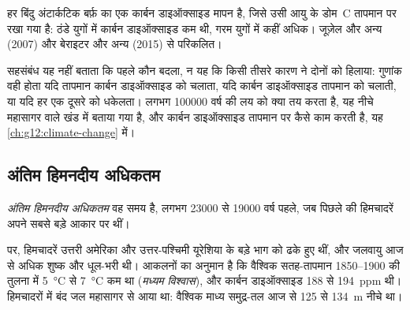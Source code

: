 \begin{omfigure}

{\small हर बिंदु अंटार्कटिक बर्फ़ का एक कार्बन डाइऑक्साइड मापन है,
जिसे उसी आयु के डोम~C तापमान पर रखा गया है: ठंडे युगों में कार्बन
डाइऑक्साइड कम थी, गरम युगों में कहीं अधिक। जूज़ेल और अन्य (2007) और
बेराइटर और अन्य (2015) से परिकलित।}
\end{omfigure}

सहसंबंध यह नहीं बताता कि पहले कौन बदला, न यह कि किसी तीसरे कारण ने
दोनों को हिलाया: गुणांक वही होता यदि तापमान कार्बन डाइऑक्साइड को चलाता,
यदि कार्बन डाइऑक्साइड तापमान को चलाती, या यदि हर एक दूसरे को धकेलता।
लगभग \num{100000} वर्ष की लय को क्या तय करता है, यह नीचे महासागर वाले
खंड में बताया गया है, और कार्बन डाइऑक्साइड तापमान पर कैसे काम करती है, यह
\cref{ch:g12:climate-change} में।

\subsection{अंतिम हिमनदीय अधिकतम}

\begin{definition}\label{def:g12:past-climates:lgm}
\emph{अंतिम हिमनदीय अधिकतम} वह समय है, लगभग
\num{23000} से \num{19000} वर्ष पहले, जब पिछले  की हिमचादरें अपने सबसे बड़े आकार पर थीं।
\end{definition}

 पर, हिमचादरें उत्तरी अमेरिका और
उत्तर-पश्चिमी यूरेशिया के बड़े भाग को ढके हुए थीं, और जलवायु आज से अधिक शुष्क और धूल-भरी थी।
आकलनों का अनुमान है कि वैश्विक सतह-तापमान 1850--1900 की तुलना में \qty{5}{\degreeCelsius}
से \qty{7}{\degreeCelsius} कम था (\emph{मध्यम विश्वास}),
और कार्बन डाइऑक्साइड 188 से \qty{194}{ppm} थी। हिमचादरों में बंद
जल महासागर से आया था: वैश्विक माध्य समुद्र-तल आज से 125 से \qty{134}{m}
नीचे था।

